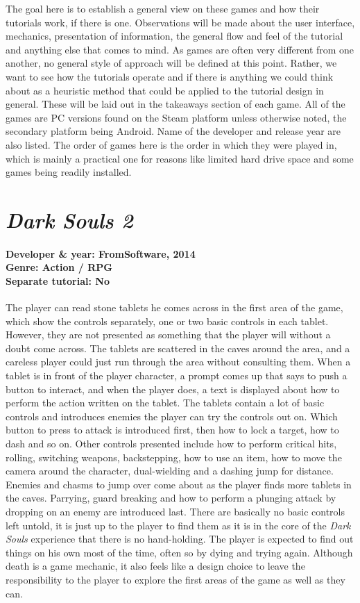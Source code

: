 The goal here is to establish a general view on these games and how their tutorials work, if there is one. Observations will be made about the user interface, mechanics, presentation of information, the general flow and feel of the tutorial and anything else that comes to mind. As games are often very different from one another, no general style of approach will be defined at this point. Rather, we want to see how the tutorials operate and if there is anything we could think about as a heuristic method that could be applied to the tutorial design in general. These will be laid out in the takeaways section of each game. All of the games are PC versions found on the Steam platform unless otherwise noted, the secondary platform being Android. Name of the developer and release year are also listed. The order of games here is the order in which they were played in, which is mainly a practical one for reasons like limited hard drive space and some games being readily installed.  

\section{\textit{Dark Souls 2}}
\paragraph{Developer \& year: FromSoftware, 2014 \\ Genre: Action / RPG \\ Separate tutorial: No \\}
The player can read stone tablets he comes across in the first area of the game, which show the controls separately, one or two basic controls in each tablet. However, they are not presented as something that the player will without a doubt come across. The tablets are scattered in the caves around the area, and a careless player could just run through the area without consulting them. When a tablet is in front of the player character, a prompt comes up that says to push a button to interact, and when the player does, a text is displayed about how to perform the action written on the tablet. The tablets contain a lot of basic controls and introduces enemies the player can try the controls out on. Which button to press to attack is introduced first, then how to lock a target, how to dash and so on. Other controls presented include how to perform critical hits, rolling, switching weapons, backstepping, how to use an item, how to move the camera around the character, dual-wielding and a dashing jump for distance. Enemies and chasms to jump over come about as the player finds more tablets in the caves. Parrying, guard breaking and how to perform a plunging attack by dropping on an enemy are introduced last. There are basically no basic controls left untold, it is just up to the player to find them as it is in the core of the \textit{Dark Souls} experience that there is no hand-holding. The player is expected to find out things on his own most of the time, often so by dying and trying again. Although death is a game mechanic, it also feels like a design choice to leave the responsibility to the player to explore the first areas of the game as well as they can.
